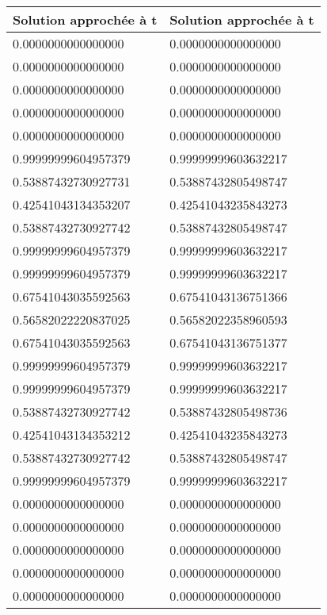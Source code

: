 \documentclass[a4paper,12pt,twoside]{report}
\begin{document}
\begin{tabular}{|l|l|}
  \hline
  Solution approchée à t \approx 4&  Solution approchée à t \approx 8\\
  \hline
	0.0000000000000000 &	0.0000000000000000\\
	0.0000000000000000&	0.0000000000000000\\
	0.0000000000000000 &	0.0000000000000000\\
	0.0000000000000000&	0.0000000000000000\\
	0.0000000000000000 &	0.0000000000000000\\

0.99999999604957379 & 0.99999999603632217\\ 
	0.53887432730927731& 0.53887432805498747 \\
0.42541043134353207& 0.42541043235843273 \\
0.53887432730927742 &0.53887432805498747\\
0.99999999604957379 &0.99999999603632217\\ 

	0.99999999604957379&  0.99999999603632217 \\    
0.67541043035592563   &0.67541043136751366 \\  

0.56582022220837025& 0.56582022358960593 \\
	0.67541043035592563 & 0.67541043136751377\\  
	0.99999999604957379 & 0.99999999603632217 \\

0.99999999604957379 &0.99999999603632217  \\
	0.53887432730927742 &0.53887432805498736 \\
0.42541043134353212 &0.42541043235843273\\
	0.53887432730927742 &0.53887432805498747 \\
0.99999999604957379&0.99999999603632217 \\
	
	0.0000000000000000 &	0.0000000000000000\\
	0.0000000000000000&	0.0000000000000000\\
	0.0000000000000000 &	0.0000000000000000\\
	0.0000000000000000&	0.0000000000000000\\
	0.0000000000000000 &	0.0000000000000000\\

  \hline
\end{tabular}
\end{document}

